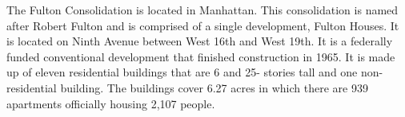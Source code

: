      

   

The Fulton Consolidation is located in Manhattan. This consolidation is named after Robert Fulton and is comprised of a single development, Fulton Houses. It is located on Ninth Avenue between West 16th and West 19th. It is a federally funded conventional development that finished construction in 1965. It is made up of eleven residential buildings that are 6 and 25- stories tall and one non-residential building. The buildings cover 6.27 acres in which there are 939 apartments officially housing 2,107 people. 